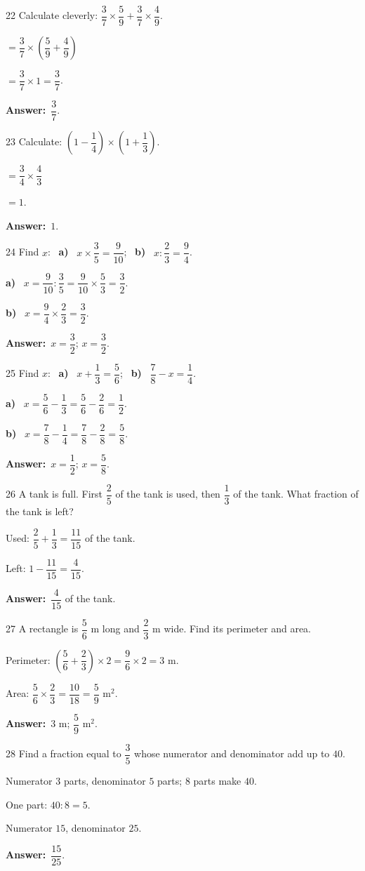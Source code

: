 \documentclass[11pt]{article}
\newif\ifsol \solfalse
\providecommand{\AnsWord}{Đáp số}
\newcommand{\dapso}[1]{\par\textbf{\AnsWord:}\ #1}
\newcommand{\probsol}[1]{%
  \begin{lrbox}{\solmeasure}\begin{minipage}{\dimexpr\linewidth-24pt\relax}#1\end{minipage}\end{lrbox}%
  \ifsol
    \begin{solbox}#1\end{solbox}%
  \else
    \setlength{\solht}{\dimexpr\ht\solmeasure+\dp\solmeasure+0.85cm\relax}%
    \ifdim\solht<1.35cm\setlength{\solht}{1.35cm}\fi
    \begin{tcolorbox}[colback=white,colframe=Line,boxrule=0.8pt,arc=5pt,
      left=8pt,right=8pt,top=4pt,bottom=4pt,height=\solht]{\footnotesize\color{Slate}\itshape\WorkWord}\end{tcolorbox}%
  \fi}
\newcommand{\pa}[1]{\textbf{#1)}\ }
\newcommand{\gap}{\vspace{0.3cm}}
\def\WorkWord{Your work:}
\def\AnsWord{Answer}
\begin{document}
\gap
\begin{probbox}{22}{\relax}
Calculate cleverly: $\dfrac37\times\dfrac59+\dfrac37\times\dfrac49$.
\end{probbox}
\probsol{
$=\dfrac37\times\left(\dfrac59+\dfrac49\right)$\par $=\dfrac37\times1=\dfrac37$.
\dapso{$\dfrac37$.}}
\gap
\begin{probbox}{23}{\relax}
Calculate: $\left(1-\dfrac14\right)\times\left(1+\dfrac13\right)$.
\end{probbox}
\probsol{
$=\dfrac34\times\dfrac43$\par $=1$.
\dapso{$1$.}}
\gap
\begin{probbox}{24}{\relax}
Find $x$: \ \pa{a} $x\times\dfrac35=\dfrac9{10}$; \ \pa{b} $x:\dfrac23=\dfrac94$.
\end{probbox}
\probsol{
\pa{a} $x=\dfrac9{10}:\dfrac35=\dfrac9{10}\times\dfrac53=\dfrac32$.\par \pa{b} $x=\dfrac94\times\dfrac23=\dfrac32$.
\dapso{$x=\dfrac32$; $x=\dfrac32$.}}
\gap
\begin{probbox}{25}{\relax}
Find $x$: \ \pa{a} $x+\dfrac13=\dfrac56$; \ \pa{b} $\dfrac78-x=\dfrac14$.
\end{probbox}
\probsol{
\pa{a} $x=\dfrac56-\dfrac13=\dfrac56-\dfrac26=\dfrac12$.\par \pa{b} $x=\dfrac78-\dfrac14=\dfrac78-\dfrac28=\dfrac58$.
\dapso{$x=\dfrac12$; $x=\dfrac58$.}}
\gap
\begin{probbox}{26}{\relax}
A tank is full. First $\dfrac25$ of the tank is used, then $\dfrac13$ of the tank. What fraction of the tank is left?
\end{probbox}
\probsol{
Used: $\dfrac25+\dfrac13=\dfrac{11}{15}$ of the tank.\par Left: $1-\dfrac{11}{15}=\dfrac4{15}$.
\dapso{$\dfrac4{15}$ of the tank.}}
\gap
\begin{probbox}{27}{\relax}
A rectangle is $\dfrac56$ m long and $\dfrac23$ m wide. Find its perimeter and area.
\end{probbox}
\probsol{
Perimeter: $\left(\dfrac56+\dfrac23\right)\times2=\dfrac96\times2=3$ m.\par Area: $\dfrac56\times\dfrac23=\dfrac{10}{18}=\dfrac59$ m$^2$.
\dapso{$3$ m; $\dfrac59$ m$^2$.}}
\gap
\begin{probbox}{28}{\relax}
Find a fraction equal to $\dfrac35$ whose numerator and denominator add up to $40$.
\end{probbox}
\probsol{
Numerator $3$ parts, denominator $5$ parts; $8$ parts make $40$.\par One part: $40:8=5$.\par Numerator $15$, denominator $25$.
\dapso{$\dfrac{15}{25}$.}}
\end{document}
